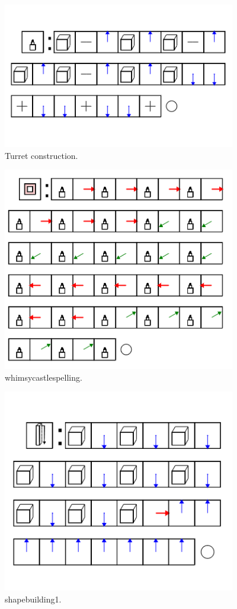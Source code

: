 \begin{figure}
	\centering
	\includegraphics[width=4in]{figures/geometron3d/whimsycastleturret.png}
	\caption[whimsycastleturret]
	{Turret construction.}
\end{figure}

\begin{figure}
	\centering
	\includegraphics[width=4in]{figures/geometron3d/whimsycastlespelling.png}
	\caption[whimsycastlespelling]
	{whimsycastlespelling.}
\end{figure}


\begin{figure}
	\centering
	\includegraphics[width=4in]{figures/geometron3d/shapebuilding1.png}
	\caption[shapebuilding1]
	{shapebuilding1.}
\end{figure}

